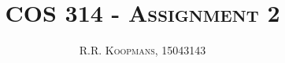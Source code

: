 \documentclass[10pt,a4paper]{article}
\author{\textsc{R.R. Koopmans, 15043143}}
\title{\textsc{COS 314 - Assignment 2}}
\begin{document}
\maketitle

  
  \pagebreak
  
\end{document}
